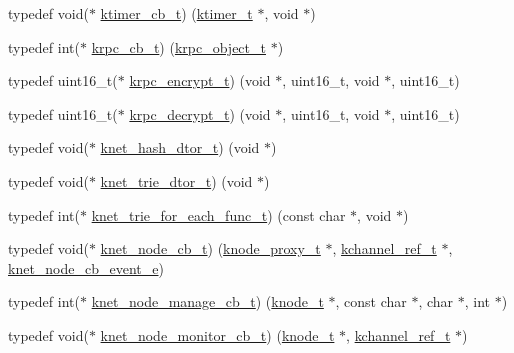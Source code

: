\begin{DoxyCompactItemize}
\item 
typedef void($\ast$ \hyperlink{a00066_a2333fd0f2c3a85faf586300ca40deed4_a2333fd0f2c3a85faf586300ca40deed4}{ktimer\+\_\+cb\+\_\+t}) (\hyperlink{a00066_a846172ea4e8a86449eca41a3d8e074b7_a846172ea4e8a86449eca41a3d8e074b7}{ktimer\+\_\+t} $\ast$, void $\ast$)
\item 
typedef int($\ast$ \hyperlink{a00066_a06bb708c1b97445d3a5d0c1b32ad2ab6_a06bb708c1b97445d3a5d0c1b32ad2ab6}{krpc\+\_\+cb\+\_\+t}) (\hyperlink{a00066_a9c07dfc8c3b965f75b09f82fdb1bbb1e_a9c07dfc8c3b965f75b09f82fdb1bbb1e}{krpc\+\_\+object\+\_\+t} $\ast$)
\item 
typedef uint16\+\_\+t($\ast$ \hyperlink{a00066_ae41a67cc07f8dff897ca978e03b1f2d7_ae41a67cc07f8dff897ca978e03b1f2d7}{krpc\+\_\+encrypt\+\_\+t}) (void $\ast$, uint16\+\_\+t, void $\ast$, uint16\+\_\+t)
\item 
typedef uint16\+\_\+t($\ast$ \hyperlink{a00066_a5cf750f151c90f0589f68fe8c4421f1d_a5cf750f151c90f0589f68fe8c4421f1d}{krpc\+\_\+decrypt\+\_\+t}) (void $\ast$, uint16\+\_\+t, void $\ast$, uint16\+\_\+t)
\item 
typedef void($\ast$ \hyperlink{a00066_af806592520383146be2f3aac316beb45_af806592520383146be2f3aac316beb45}{knet\+\_\+hash\+\_\+dtor\+\_\+t}) (void $\ast$)
\item 
typedef void($\ast$ \hyperlink{a00066_a46741b0dab7bbb26d611c429ee64d78c_a46741b0dab7bbb26d611c429ee64d78c}{knet\+\_\+trie\+\_\+dtor\+\_\+t}) (void $\ast$)
\item 
typedef int($\ast$ \hyperlink{a00066_ad77af676ce15810f8f713bb3eaa91fe8_ad77af676ce15810f8f713bb3eaa91fe8}{knet\+\_\+trie\+\_\+for\+\_\+each\+\_\+func\+\_\+t}) (const char $\ast$, void $\ast$)
\item 
typedef void($\ast$ \hyperlink{a00066_a09c2d1f8eef7dc82226691ce39b7c4d8_a09c2d1f8eef7dc82226691ce39b7c4d8}{knet\+\_\+node\+\_\+cb\+\_\+t}) (\hyperlink{a00066_a5025c3e4422f5f55b981aad6e56b6d89_a5025c3e4422f5f55b981aad6e56b6d89}{knode\+\_\+proxy\+\_\+t} $\ast$, \hyperlink{a00066_a3b7e82599367eade261456f60ebe2cd9_a3b7e82599367eade261456f60ebe2cd9}{kchannel\+\_\+ref\+\_\+t} $\ast$, \hyperlink{a00066_a7aebece745b529163834cdbd7ab3ac3f_a7aebece745b529163834cdbd7ab3ac3f}{knet\+\_\+node\+\_\+cb\+\_\+event\+\_\+e})
\item 
typedef int($\ast$ \hyperlink{a00066_acd4bad75f444cb56dffa5f9413bbe456_acd4bad75f444cb56dffa5f9413bbe456}{knet\+\_\+node\+\_\+manage\+\_\+cb\+\_\+t}) (\hyperlink{a00066_a5e720b27efbc9ad744240f5f4233763a_a5e720b27efbc9ad744240f5f4233763a}{knode\+\_\+t} $\ast$, const char $\ast$, char $\ast$, int $\ast$)
\item 
typedef void($\ast$ \hyperlink{a00066_aabd13837697aceb20b2a2cb8908e79cd_aabd13837697aceb20b2a2cb8908e79cd}{knet\+\_\+node\+\_\+monitor\+\_\+cb\+\_\+t}) (\hyperlink{a00066_a5e720b27efbc9ad744240f5f4233763a_a5e720b27efbc9ad744240f5f4233763a}{knode\+\_\+t} $\ast$, \hyperlink{a00066_a3b7e82599367eade261456f60ebe2cd9_a3b7e82599367eade261456f60ebe2cd9}{kchannel\+\_\+ref\+\_\+t} $\ast$)
\end{DoxyCompactItemize}
